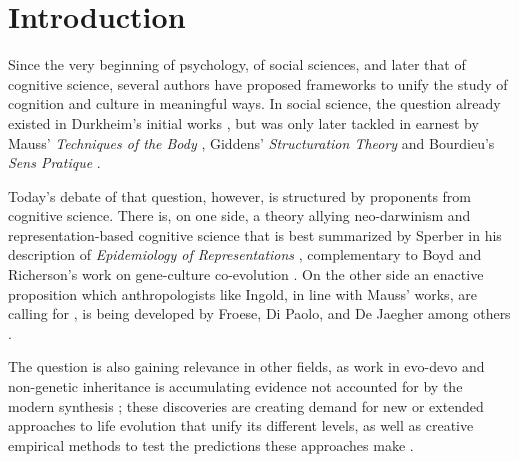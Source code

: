 
\section{Introduction} %



\begin{new}
Since the very beginning of psychology, of social sciences, and later that of cognitive science, several authors have proposed frameworks to unify the study of cognition and culture in meaningful ways.
In social science, the question already existed in Durkheim's initial works \CN, but was only later tackled in earnest by Mauss' \emph{Techniques of the Body} \CN, Giddens' \emph{Structuration Theory} \CN and Bourdieu's \emph{Sens Pratique} \CN.

Today's debate of that question, however, is structured by proponents from cognitive science.
There is, on one side, a theory allying neo-darwinism and representation-based cognitive science that is best summarized by Sperber in his description of \emph{Epidemiology of Representations} \CN, complementary to Boyd and Richerson's work on gene-culture co-evolution \CN.
On the other side an enactive proposition which anthropologists like Ingold, in line with Mauss' works, are calling for \CN, is being developed by Froese, Di Paolo, and De Jaegher among others \CNs.

The question is also gaining relevance in other fields, as work in evo-devo and non-genetic inheritance is accumulating evidence not accounted for by the modern synthesis \CN;
these discoveries are creating demand for new or extended approaches to life evolution that unify its different levels, as well as creative empirical methods to test the predictions these approaches make \CN.

\end{new}

